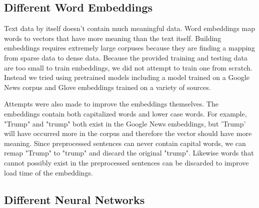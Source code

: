 \documentclass{article}
\begin{document}
\subsection{Different Word Embeddings}

Text data by itself doesn't contain much meaningful data. Word embeddings map words to vectors that have more meaning than the text itself. Building embeddings requires extremely large corpuses because they are finding a mapping from sparse data to dense data. Because the provided training and testing data are too small to train embeddings, we did not attempt to train one from scratch. Instead we tried using pretrained models including a model trained on a Google News corpus and Glove embeddings trained on a variety of sources.

Attempts were also made to improve the embeddings themselves. The embeddings contain both capitalized words and lower case words. For example, "Trump" and "trump" both exist in the Google News embeddings, but 'Trump' will have occurred more in the corpus and therefore the vector should have more meaning. Since preprocessed sentences can never contain capital words, we can remap "Trump" to "trump" and discard the original "trump". Likewise words that cannot possibly exist in the preprocessed sentences can be discarded to improve load time of the embeddings.

\subsection{Different Neural Networks}
\end{document}
